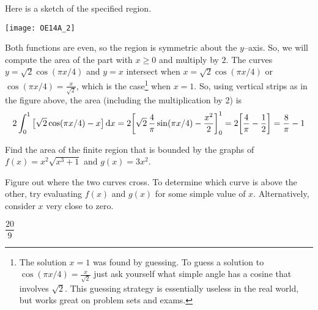 \begin{solution}
Here is a sketch of the specified region.

\begin{center}
       \texttt{[image: OE14A\_2]}
\end{center}

\noindent
Both functions are even, so the region  is symmetric about the $y$--axis.
So, we will compute the area of the part with $x\ge 0$ and multiply
by $2$. The curves $y=\sqrt{2} \cos(\pi x/4)$ and $y=x$ intersect
when $x=\sqrt{2} \cos(\pi x/4)$ or $\cos(\pi x/4)=\frac{x}{\sqrt{2}}$,
which is the case\footnote{The solution $x=1$ was found by guessing.
To guess a solution to $\cos(\pi x/4)=\frac{x}{\sqrt{2}}$ just ask
yourself what simple angle has a cosine that involves $\sqrt{2}$. This
guessing strategy is essentially useless in the real world, but
works great on problem sets and exams.}
when $x=1$. So, using vertical strips as in
the figure above, the area (including the multiplication by 2) is
\begin{equation*}
2\int_0^1 \big[\sqrt{2} \cos(\pi x/4) - x\big]\,\mathrm{d}x
= 2\bigg[\sqrt{2}\,\frac{4}{\pi} \sin(\pi x/4)-\frac{x^2}{2}\bigg]_0^1
= 2\bigg[\frac{4}{\pi}-\frac{1}{2}\bigg] = \frac{8}{\pi}-1
\end{equation*}

\end{solution}

\begin{Mquestion}[2016Q2]
Find the area of the finite region that is bounded by the graphs of
$f(x) = x^2\sqrt{x^3+1}$ and $g(x) = 3x^2$.
\end{Mquestion}

\begin{hint}
Figure out where the two curves cross. To determine which curve is above the
other, try evaluating $f(x)$ and $g(x)$ for some simple value of $x$.
Alternatively, consider $x$ very close to zero.
\end{hint}

\begin{answer}
$\dfrac{20}{9}$
\end{answer}

